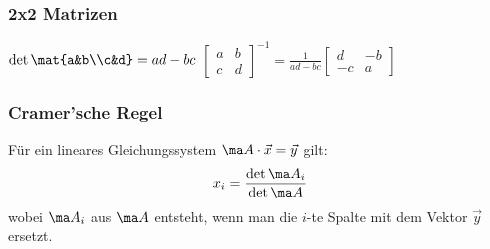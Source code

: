 \documentclass[fs, footer]{latex4ei}
\begin{document}
\begin{multicols*}{4}
{    \subsubsection{2x2 Matrizen}
    $\det\mat{a&b\\c&d} = ad-bc$\qquad
    $\begin{bmatrix}
            a & b \\c&d
        \end{bmatrix}^{-1} =\frac{1}{ad-bc} \begin{bmatrix}
            d & -b \\-c&a
        \end{bmatrix}$

    \subsubsection{Cramer'sche Regel}
    Für ein lineares Gleichungssystem $\ma A \cdot \vec x = \vec y$ gilt:
    $$x_i=\frac{\det \ma A_i}{\det \ma A}$$
    wobei $\ma A_i$ aus $\ma A$ entsteht, wenn man die $i$-te Spalte mit dem Vektor $\vec y$ ersetzt.
    }



\end{multicols*}
\end{document}
